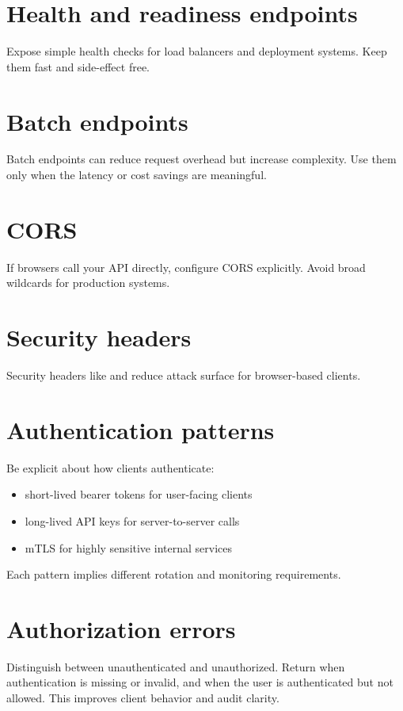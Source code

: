 \section{Health and readiness endpoints}
Expose simple health checks for load balancers and deployment systems.
Keep them fast and side-effect free.

\section{Batch endpoints}
Batch endpoints can reduce request overhead but increase complexity.
Use them only when the latency or cost savings are meaningful.

\section{CORS}
If browsers call your API directly, configure CORS explicitly.
Avoid broad wildcards for production systems.

\section{Security headers}
Security headers like  and 
reduce attack surface for browser-based clients.

\section{Authentication patterns}
Be explicit about how clients authenticate:
\begin{itemize}[nosep]
  \item short-lived bearer tokens for user-facing clients
  \item long-lived API keys for server-to-server calls
  \item mTLS for highly sensitive internal services
\end{itemize}

Each pattern implies different rotation and monitoring requirements.

\section{Authorization errors}
Distinguish between unauthenticated and unauthorized.
Return  when authentication is missing or invalid, and  when the user is authenticated but not allowed.
This improves client behavior and audit clarity.

